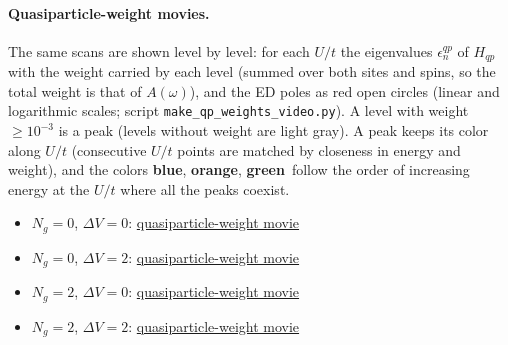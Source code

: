 \documentclass[11pt]{article}
\newcommand{\Ng}{N_{g}}
\newcommand{\dV}{\Delta V}
\newcommand{\lvA}{\textcolor{lvA}{\textbf{blue}}}\newcommand{\lvB}{\textcolor{lvB}{\textbf{orange}}}
\newcommand{\lvC}{\textcolor{lvC}{\textbf{green}}}\newcommand{\lvD}{\textcolor{lvD}{\textbf{purple}}}
\begin{document}
\paragraph{Quasiparticle-weight movies.}
The same scans are shown level by level: for each $U/t$ the eigenvalues $\epsilon^{qp}_n$ of $H_{qp}$ with the weight carried by each level
(summed over both sites and spins, so the total weight is that of $A(\omega)$), and the ED poles as red open circles (linear and logarithmic scales;
script \texttt{make\_qp\_weights\_video.py}). A level with weight $\ge10^{-3}$ is a peak (levels without weight are light gray). A peak keeps its color along $U/t$ (consecutive $U/t$ points are matched by closeness in energy and weight),
and the colors \lvA, \lvB, \lvC\ follow the order of increasing energy at the $U/t$ where all the peaks coexist.
\begin{itemize}[nosep]
  \item $\Ng=0$, $\dV=0$: \href{run:../scan_ng0/dV_0.0/qp_weights_vs_U.mp4}{quasiparticle-weight movie}
  \item $\Ng=0$, $\dV=2$: \href{run:../scan_ng0/dV_2.0/qp_weights_vs_U.mp4}{quasiparticle-weight movie}
  \item $\Ng=2$, $\dV=0$: \href{run:../scan_ng2_not_imp/qp_weights_vs_U.mp4}{quasiparticle-weight movie}
  \item $\Ng=2$, $\dV=2$: \href{run:../scan_ng2_dV2_confirmed/qp_weights_vs_U.mp4}{quasiparticle-weight movie}
\end{itemize}
\end{document}
